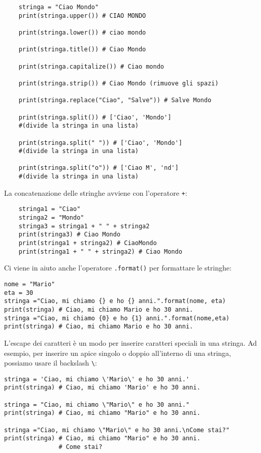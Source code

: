 \documentclass[a4paper,12pt]{article}
\begin{document}
\begin{lstlisting}
    stringa = "Ciao Mondo"
    print(stringa.upper()) # CIAO MONDO

    print(stringa.lower()) # ciao mondo

    print(stringa.title()) # Ciao Mondo

    print(stringa.capitalize()) # Ciao mondo

    print(stringa.strip()) # Ciao Mondo (rimuove gli spazi)

    print(stringa.replace("Ciao", "Salve")) # Salve Mondo

    print(stringa.split()) # ['Ciao', 'Mondo']
    #(divide la stringa in una lista)

    print(stringa.split(" ")) # ['Ciao', 'Mondo']
    #(divide la stringa in una lista)

    print(stringa.split("o")) # ['Ciao M', 'nd']
    #(divide la stringa in una lista)
\end{lstlisting}
\vspace{1em}
La concatenazione delle stringhe avviene con l'operatore \texttt{+}:
\begin{lstlisting}
    stringa1 = "Ciao"
    stringa2 = "Mondo"
    stringa3 = stringa1 + " " + stringa2
    print(stringa3) # Ciao Mondo
    print(stringa1 + stringa2) # CiaoMondo
    print(stringa1 + " " + stringa2) # Ciao Mondo
\end{lstlisting}
Ci viene in aiuto anche l'operatore \texttt{.format()} per formattare le stringhe:
\begin{lstlisting}
nome = "Mario"
eta = 30
stringa ="Ciao, mi chiamo {} e ho {} anni.".format(nome, eta)
print(stringa) # Ciao, mi chiamo Mario e ho 30 anni.
stringa ="Ciao, mi chiamo {0} e ho {1} anni.".format(nome,eta)
print(stringa) # Ciao, mi chiamo Mario e ho 30 anni.
\end{lstlisting}
\vspace{1em}
L'escape dei caratteri è un modo per inserire caratteri speciali in una stringa. Ad esempio, per inserire un apice singolo o doppio all'interno di una stringa, possiamo usare il backslash \texttt{\textbackslash}:
\begin{lstlisting}
stringa = 'Ciao, mi chiamo \'Mario\' e ho 30 anni.'
print(stringa) # Ciao, mi chiamo 'Mario' e ho 30 anni.

stringa = "Ciao, mi chiamo \"Mario\" e ho 30 anni."
print(stringa) # Ciao, mi chiamo "Mario" e ho 30 anni.

stringa ="Ciao, mi chiamo \"Mario\" e ho 30 anni.\nCome stai?"
print(stringa) # Ciao, mi chiamo "Mario" e ho 30 anni.
               # Come stai?
\end{lstlisting}
\vspace{1em}
\end{document}

